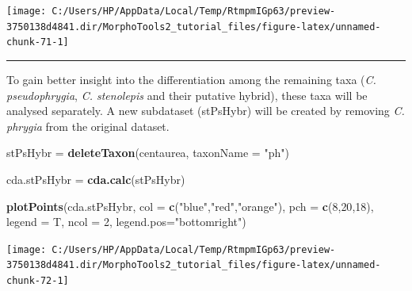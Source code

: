\documentclass[
]{article}
\newenvironment{Shaded}{\begin{snugshade}}{\end{snugshade}}
\newcommand{\DataTypeTok}[1]{\textcolor[rgb]{0.13,0.29,0.53}{#1}}
\newcommand{\DecValTok}[1]{\textcolor[rgb]{0.00,0.00,0.81}{#1}}
\newcommand{\KeywordTok}[1]{\textcolor[rgb]{0.13,0.29,0.53}{\textbf{#1}}}
\newcommand{\NormalTok}[1]{#1}
\newcommand{\StringTok}[1]{\textcolor[rgb]{0.31,0.60,0.02}{#1}}
\begin{document}
\begin{center}\texttt{[image: C:/Users/HP/AppData/Local/Temp/RtmpmIGp63/preview-3750138d4841.dir/MorphoTools2\_tutorial\_files/figure-latex/unnamed-chunk-71-1]} \end{center}

\begin{center}\rule{0.5\linewidth}{\linethickness}\end{center}

To gain better insight into the differentiation among the remaining taxa
(\emph{C. pseudophrygia}, \emph{C. stenolepis} and their putative
hybrid), these taxa will be analysed separately. A new subdataset
(stPsHybr) will be created by removing \emph{C. phrygia} from the
original dataset.

\begin{Shaded}
\begin{Highlighting}[]
\NormalTok{stPsHybr =}\StringTok{ }\KeywordTok{deleteTaxon}\NormalTok{(centaurea, }\DataTypeTok{taxonName =} \StringTok{"ph"}\NormalTok{)}

\NormalTok{cda.stPsHybr =}\StringTok{ }\KeywordTok{cda.calc}\NormalTok{(stPsHybr)}

\KeywordTok{plotPoints}\NormalTok{(cda.stPsHybr, }\DataTypeTok{col =} \KeywordTok{c}\NormalTok{(}\StringTok{"blue"}\NormalTok{,}\StringTok{"red"}\NormalTok{,}\StringTok{"orange"}\NormalTok{), }\DataTypeTok{pch =} \KeywordTok{c}\NormalTok{(}\DecValTok{8}\NormalTok{,}\DecValTok{20}\NormalTok{,}\DecValTok{18}\NormalTok{), }
            \DataTypeTok{legend =}\NormalTok{ T, }\DataTypeTok{ncol =} \DecValTok{2}\NormalTok{, }\DataTypeTok{legend.pos=}\StringTok{"bottomright"}\NormalTok{)}
\end{Highlighting}
\end{Shaded}

\begin{center}\texttt{[image: C:/Users/HP/AppData/Local/Temp/RtmpmIGp63/preview-3750138d4841.dir/MorphoTools2\_tutorial\_files/figure-latex/unnamed-chunk-72-1]} \end{center}
\end{document}
